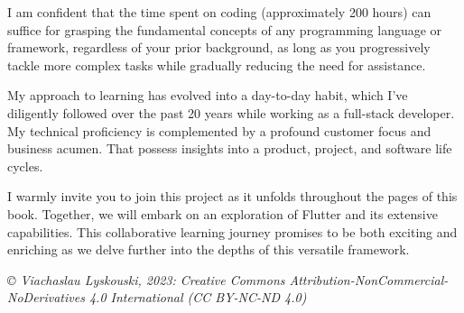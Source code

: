 \noindent I am confident that the time spent on coding (approximately 200 hours) can suffice for grasping the 
fundamental concepts of any programming language or framework, regardless of your prior background, as long as you 
progressively tackle more complex tasks while gradually reducing the need for assistance.

\vspace{3mm}

\noindent My approach to learning has evolved into a day-to-day habit, which I've diligently followed over the past 
20 years while working as a full-stack developer. My technical proficiency is complemented by a profound customer 
focus and business acumen. That possess insights into a product, project, and software life cycles.

\vspace{3mm}

\noindent I warmly invite you to join this project as it unfolds throughout the pages of this book. Together, we will 
embark on an exploration of Flutter and its extensive capabilities. This collaborative learning journey promises to 
be both exciting and enriching as we delve further into the depths of this versatile framework.


\vspace{1cm}


\noindent \emph{\small © Viachaslau Lyskouski, 2023: Creative Commons Attribution-NonCommercial-NoDerivatives 4.0 
International (CC BY-NC-ND 4.0)}
            

\newpage
\thispagestyle{empty}
~